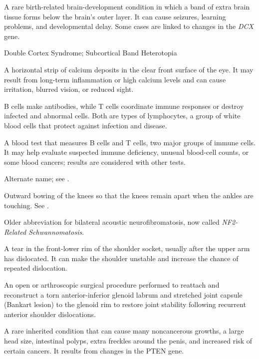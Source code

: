  A rare birth-related brain-development condition in which a band of extra brain tissue forms below the brain's outer layer. It can cause seizures, learning problems, and developmental delay. Some cases are linked to changes in the \textit{DCX} gene.

\synonyms
Double Cortex Syndrome; Subcortical Band Heterotopia

 A horizontal strip of calcium deposits in the clear front surface of the eye. It may result from long-term inflammation or high calcium levels and can cause irritation, blurred vision, or reduced sight.

 B cells make antibodies, while T cells coordinate immune responses or destroy infected and abnormal cells. Both are types of lymphocytes, a group of white blood cells that protect against infection and disease.

 A blood test that measures B cells and T cells, two major groups of immune cells. It may help evaluate suspected immune deficiency, unusual blood-cell counts, or some blood cancers; results are considered with other tests.

 Alternate name; see .

 Outward bowing of the knees so that the knees remain apart when the ankles are touching. See .

 Older abbreviation for bilateral acoustic neurofibromatosis, now called \textit{NF2-Related Schwannomatosis}.

 A tear in the front-lower rim of the shoulder socket, usually after the upper arm has dislocated. It can make the shoulder unstable and increase the chance of repeated dislocation.

 An open or arthroscopic surgical procedure performed to reattach and reconstruct a torn anterior-inferior glenoid labrum and stretched joint capsule (Bankart lesion) to the glenoid rim to restore joint stability following recurrent anterior shoulder dislocations.

 A rare inherited condition that can cause many noncancerous growths, a large head size, intestinal polyps, extra freckles around the penis, and increased risk of certain cancers. It results from changes in the PTEN gene.

